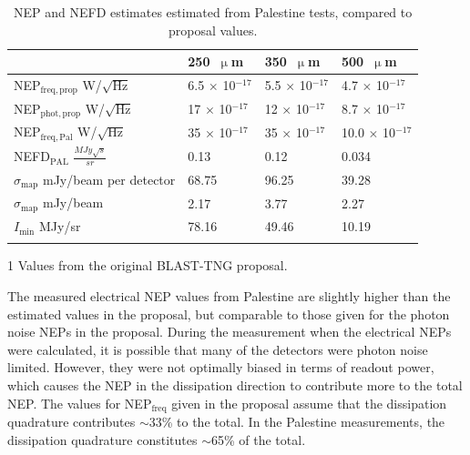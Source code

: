 \begin{table}[!htbp]
  \begin{threeparttable}
\centering
\caption{NEP and NEFD estimates estimated from Palestine tests, compared to proposal values.}
\label{table:NEP comparison}
\begin{tabular}{@{}llll@{}}
\dtoprule{}
 & 250~$\upmu$m & 350~$\upmu$m & 500~$\upmu$m \\ \midrule
NEP$_{\mathrm{freq,prop}}$\tnote{1} W/$\sqrt{\mathrm{Hz}}$ & 6.5 $\times$ 10$^{-17}$ & 5.5 $\times$ 10$^{-17}$ & 4.7 $\times$ 10$^{-17}$ \\
NEP$_{\mathrm{phot,prop}}$ W/$\sqrt{\mathrm{Hz}}$ & 17 $\times$ 10$^{-17}$ & 12 $\times$ 10$^{-17}$ & 8.7 $\times$ 10$^{-17}$ \\
NEP$_{\mathrm{freq,Pal}}$ W/$\sqrt{\mathrm{Hz}}$ & 35 $\times$ 10$^{-17}$ & 35 $\times$ 10$^{-17}$ & 10.0 $\times$ 10$^{-17}$ \\
NEFD$_{\mathrm{PAL}}$ $\frac{MJy\sqrt{s}}{sr}$ & 0.13 & 0.12 & 0.034 \\
$\sigma_{\mathrm{map}}$ mJy/beam per detector & 68.75 & 96.25 & 39.28 \\
$\sigma_{\mathrm{map}}$ mJy/beam & 2.17 & 3.77 & 2.27 \\
$I_{\mathrm{min}}$ MJy/sr & 78.16 & 49.46 & 10.19 \\ \dbottomrule{}
\\
\end{tabular}
\begin{tablenotes}
\item [1] Values from the original BLAST-TNG proposal.
\vspace{2mm}
\end{tablenotes}
\end{threeparttable}
\end{table}

The measured electrical NEP values from Palestine are slightly higher than the estimated values in the proposal, but comparable to those given for the photon noise NEPs in the proposal. During the measurement when the electrical NEPs were calculated, it is possible that many of the detectors were photon noise limited. However, they were not optimally biased in terms of readout power, which causes the NEP in the dissipation direction to contribute more to the total NEP\@. The values for NEP$_{\mathrm{freq}}$ given in the proposal assume that the dissipation quadrature contributes $\sim$33\% to the total. In the Palestine measurements, the dissipation quadrature constitutes $\sim$65\% of the total.

